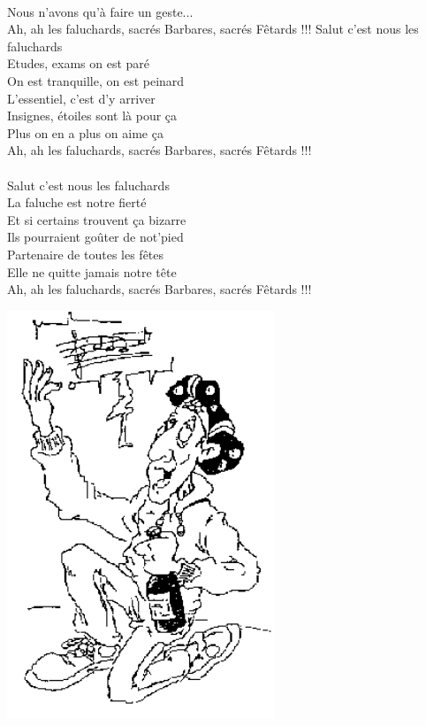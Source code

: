 \\Nous n'avons qu'à faire un geste...
\\Ah, ah les faluchards, sacrés Barbares, sacrés Fêtards !!!
\breakpage
Salut c'est nous les faluchards
\\Etudes, exams on est paré
\\On est tranquille, on est peinard
\\L'essentiel, c'est d'y arriver
\\Insignes, étoiles sont là pour ça
\\Plus on en a plus on aime ça
\\Ah, ah les faluchards, sacrés Barbares, sacrés Fêtards !!!
\\\\Salut c'est nous les faluchards
\\La faluche est notre fierté
\\Et si certains trouvent ça bizarre
\\Ils pourraient goûter de not'pied
\\Partenaire de toutes les fêtes
\\Elle ne quitte jamais notre tête
\\Ah, ah les faluchards, sacrés Barbares, sacrés Fêtards !!!
\\
\bigskip
\begin{center}
\includegraphics[width=0.6\textwidth]{images/Hymne.PNG}
\end{center}

\breakpage